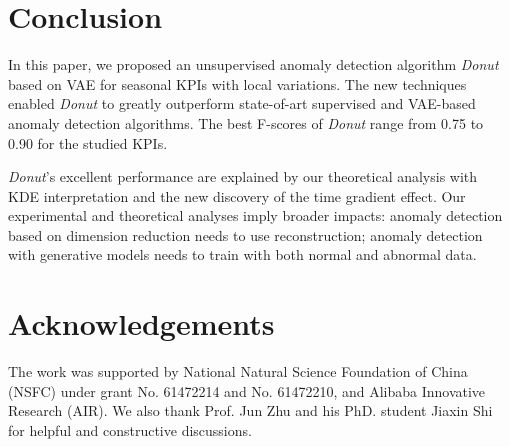 \documentclass[sigconf]{acmart}
\newcommand{\DONUT}{\textit{Donut}}
\begin{document}
\section{Conclusion}
\label{sec:conclusion}

In this paper, we proposed an unsupervised anomaly detection algorithm  \DONUT{} based on VAE for seasonal KPIs with local variations. The new techniques enabled \DONUT{} to greatly outperform state-of-art supervised and VAE-based anomaly detection algorithms.  The best F-scores of \DONUT{} range from 0.75 to 0.90 for the studied KPIs.

\DONUT{}'s excellent performance are explained by our theoretical analysis with KDE interpretation and the new discovery of the time gradient effect. Our experimental and theoretical analyses imply broader impacts: anomaly detection based on dimension reduction needs to use reconstruction; anomaly detection with generative models needs to train with both normal and abnormal data.


\section{Acknowledgements}

The work was supported by National Natural Science Foundation of China (NSFC) under grant  No. 61472214 and No. 61472210, and Alibaba Innovative Research (AIR).
We also thank Prof. Jun Zhu and his PhD. student Jiaxin Shi for helpful and constructive discussions.



%



\newpage

\balance

\end{document}
